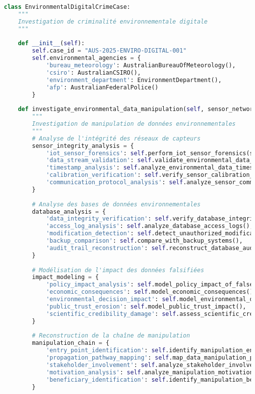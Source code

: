 \begin{lstlisting}[language=Python, caption=Investigation de criminalité environnementale digitale]
class EnvironmentalDigitalCrimeCase:
    """
    Investigation de criminalité environnementale digitale
    """
    
    def __init__(self):
        self.case_id = "AUS-2025-ENVIRO-DIGITAL-001"
        self.environmental_agencies = {
            'bureau_meteorology': AustralianBureauOfMeteorology(),
            'csiro': AustralianCSIRO(),
            'environment_department': EnvironmentDepartment(),
            'afp': AustralianFederalPolice()
        }
        
    def investigate_environmental_data_manipulation(self, sensor_networks):
        """
        Investigation de manipulation de données environnementales
        """
        # Analyse de l'intégrité des réseaux de capteurs
        sensor_integrity_analysis = {
            'iot_sensor_forensics': self.perform_iot_sensor_forensics(sensor_networks),
            'data_stream_validation': self.validate_environmental_data_streams(),
            'timestamp_analysis': self.analyze_environmental_data_timestamps(),
            'calibration_verification': self.verify_sensor_calibration_integrity(),
            'communication_protocol_analysis': self.analyze_sensor_communication_protocols()
        }
        
        # Analyse des bases de données environnementales
        database_analysis = {
            'data_integrity_verification': self.verify_database_integrity(),
            'access_log_analysis': self.analyze_database_access_logs(),
            'modification_detection': self.detect_unauthorized_modifications(),
            'backup_comparison': self.compare_with_backup_systems(),
            'audit_trail_reconstruction': self.reconstruct_database_audit_trails()
        }
        
        # Modélisation de l'impact des données falsifiées
        impact_modeling = {
            'policy_impact_analysis': self.model_policy_impact_of_false_data(),
            'economic_consequences': self.model_economic_consequences(),
            'environmental_decision_impact': self.model_environmental_decision_impact(),
            'public_trust_erosion': self.model_public_trust_impact(),
            'scientific_credibility_damage': self.assess_scientific_credibility_damage()
        }
        
        # Reconstruction de la chaîne de manipulation
        manipulation_chain = {
            'entry_point_identification': self.identify_manipulation_entry_points(),
            'propagation_pathway_mapping': self.map_data_manipulation_propagation(),
            'stakeholder_involvement': self.analyze_stakeholder_involvement(),
            'motivation_analysis': self.analyze_manipulation_motivations(),
            'beneficiary_identification': self.identify_manipulation_beneficiaries()
        }
        

\end{lstlisting}
